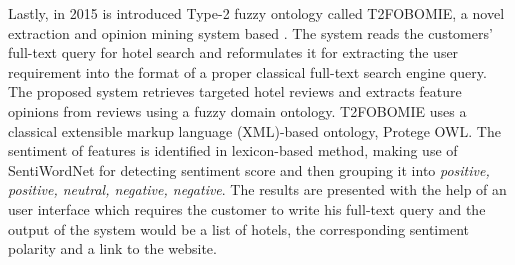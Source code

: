 Lastly, in 2015 is introduced Type-2 fuzzy ontology called T2FOBOMIE, a novel extraction and opinion mining system based \cite{ali2015type}. The system reads the  customers' full-text query for hotel search and reformulates it for extracting the user requirement into the format of a proper classical full-text search engine query. The proposed system retrieves targeted hotel reviews and extracts feature opinions from reviews using a fuzzy domain ontology. T2FOBOMIE uses a classical extensible markup language (XML)-based ontology, Protege OWL. The sentiment of features is identified in lexicon-based method, making use of SentiWordNet for detecting sentiment score and then grouping it into \textit{positive, positive, neutral, negative, negative}. The results are presented with the help of an user interface which requires the customer to write his full-text query and the output of the system would be a list of hotels, the corresponding sentiment polarity and a link to the website. 

